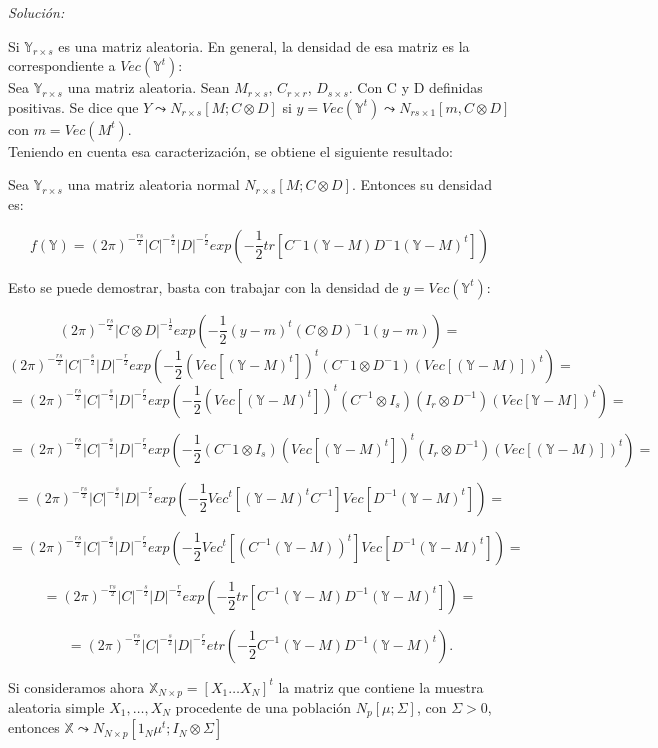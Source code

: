 \documentclass{article}
\theoremstyle{theorem-style}  %
\theoremstyle{definition-style}
\theoremstyle{example-style}
\theoremstyle{exercise-style}
\begin{document}
	\textit{Solución:}
	
	Si $\mathbb{Y}_{r\times s}$ es una matriz aleatoria. En general, la densidad de esa matriz es la correspondiente a $Vec(\mathbb{Y}^t)$: \\
	
	Sea $\mathbb{Y}_{r\times s}$ una matriz aleatoria. Sean $M_{r\times s}$, $C_{r\times r}$, $D_{s\times s}$. Con C y D definidas positivas. Se dice que $Y \leadsto N_{r \times s}[M;C\otimes D]$ si $y= Vec(\mathbb{Y}^t) \leadsto N_{rs\times 1}[m, C \otimes D]$ con $m=Vec(M^t)$. \\
	
	Teniendo en cuenta esa caracterización, se obtiene el siguiente resultado:
	
	Sea $\mathbb{Y}_{r\times s}$ una matriz aleatoria normal $N_{r\times s}[M; C \otimes D]$. Entonces su densidad es:
	
	$$f(\mathbb{Y}) = (2\pi)^{-\frac{rs}{2}}|C|^{-\frac{s}{2}}|D|^{-\frac{r}{2}}exp(-\frac{1}{2}tr[C^-1(\mathbb{Y}-M)D^-1(\mathbb{Y}-M)^t])$$
	
	Esto se puede demostrar, basta con trabajar con la densidad de $y=Vec(\mathbb{Y}^t)$:
	
	$$ (2\pi)^{-\frac{rs}{2}}|C\otimes D|^{-\frac{1}{2}} exp(-\frac{1}{2}(y-m)^t(C \otimes D)^-1(y-m)) = $$
	$$ (2\pi)^{-\frac{rs}{2}}|C|^{-\frac{s}{2}} |D|^{-\frac{r}{2}} exp(-\frac{1}{2}(Vec[(\mathbb{Y}-M)^t])^t(C^-1 \otimes D^-1)(Vec[(\mathbb{Y}-M)])^t) =$$
	$$ = (2\pi)^{-\frac{rs}{2}}|C|^{-\frac{s}{2}} |D|^{-\frac{r}{2}} exp(-\frac{1}{2}(Vec[(\mathbb{Y}-M)^t])^t(C^{-1} \otimes I_s)(I_r \otimes D^{-1})(Vec[\mathbb{Y}-M])^t) = $$
	
	$$=  (2\pi)^{-\frac{rs}{2}}|C|^{-\frac{s}{2}} |D|^{-\frac{r}{2}} exp(-\frac{1}{2} (C^-{1} \otimes I_s)(Vec[(\mathbb{Y}-M)^t])^t(I_r \otimes D^{-1})(Vec[(\mathbb{Y}-M)])^t) = $$
	
	$$ = (2\pi)^{-\frac{rs}{2}}|C|^{-\frac{s}{2}} |D|^{-\frac{r}{2}} exp(-\frac{1}{2} Vec^t[(\mathbb{Y}-M)^tC^{-1}]Vec[D^{-1}(\mathbb{Y}-M)^t]) = $$

	$$ = (2\pi)^{-\frac{rs}{2}}|C|^{-\frac{s}{2}} |D|^{-\frac{r}{2}} exp(-\frac{1}{2} Vec^t[(C^{-1}(\mathbb{Y}-M))^t]Vec[D^{-1}(\mathbb{Y}-M)^t]) = $$
	
	$$ = (2\pi)^{-\frac{rs}{2}}|C|^{-\frac{s}{2}} |D|^{-\frac{r}{2}} exp(-\frac{1}{2} tr[C^{-1}(\mathbb{Y}-M)D^{-1}(\mathbb{Y}-M)^t]) = $$
	
	$$ = (2\pi)^{-\frac{rs}{2}}|C|^{-\frac{s}{2}} |D|^{-\frac{r}{2}} etr(-\frac{1}{2} C^{-1}(\mathbb{Y}-M)D^{-1}(\mathbb{Y}-M)^t). $$
	
	Si consideramos ahora $\mathbb{X}_{N\times p} = [X_1 \dots X_N]^t$ la matriz que contiene la muestra aleatoria simple $X_1, \dots, X_N$ procedente de una población $N_p[\mu; \Sigma]$, con $\Sigma>0$, entonces $\mathbb{X} \leadsto N_{N\times p}[1_N \mu^t; I_N \otimes \Sigma]$   
	
\end{document}
